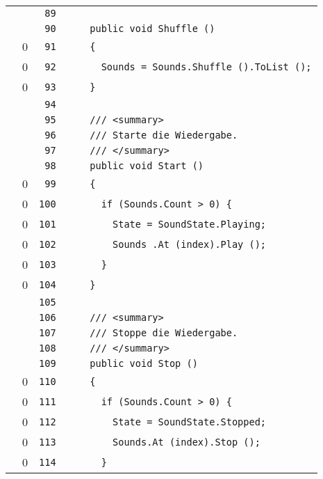 \documentclass[a4paper,10pt]{article}
\begin{document}
\begin{longtable}[l]{lrrl}
\cellcolor{gray} &  & \verb~89~ & \verb~~\\
\cellcolor{gray} &  & \verb~90~ & \verb~    public void Shuffle ()~\\
\cellcolor{red} & 0 & \verb~91~ & \verb~    {~\\
\cellcolor{red} & 0 & \verb~92~ & \verb~      Sounds = Sounds.Shuffle ().ToList ();~\\
\cellcolor{red} & 0 & \verb~93~ & \verb~    }~\\
\cellcolor{gray} &  & \verb~94~ & \verb~~\\
\cellcolor{gray} &  & \verb~95~ & \verb~    /// <summary>~\\
\cellcolor{gray} &  & \verb~96~ & \verb~    /// Starte die Wiedergabe.~\\
\cellcolor{gray} &  & \verb~97~ & \verb~    /// </summary>~\\
\cellcolor{gray} &  & \verb~98~ & \verb~    public void Start ()~\\
\cellcolor{red} & 0 & \verb~99~ & \verb~    {~\\
\cellcolor{red} & 0 & \verb~100~ & \verb~      if (Sounds.Count > 0) {~\\
\cellcolor{red} & 0 & \verb~101~ & \verb~        State = SoundState.Playing;~\\
\cellcolor{red} & 0 & \verb~102~ & \verb~        Sounds .At (index).Play ();~\\
\cellcolor{red} & 0 & \verb~103~ & \verb~      }~\\
\cellcolor{red} & 0 & \verb~104~ & \verb~    }~\\
\cellcolor{gray} &  & \verb~105~ & \verb~~\\
\cellcolor{gray} &  & \verb~106~ & \verb~    /// <summary>~\\
\cellcolor{gray} &  & \verb~107~ & \verb~    /// Stoppe die Wiedergabe.~\\
\cellcolor{gray} &  & \verb~108~ & \verb~    /// </summary>~\\
\cellcolor{gray} &  & \verb~109~ & \verb~    public void Stop ()~\\
\cellcolor{red} & 0 & \verb~110~ & \verb~    {~\\
\cellcolor{red} & 0 & \verb~111~ & \verb~      if (Sounds.Count > 0) {~\\
\cellcolor{red} & 0 & \verb~112~ & \verb~        State = SoundState.Stopped;~\\
\cellcolor{red} & 0 & \verb~113~ & \verb~        Sounds.At (index).Stop ();~\\
\cellcolor{red} & 0 & \verb~114~ & \verb~      }~\\

\end{longtable}
\end{document}
